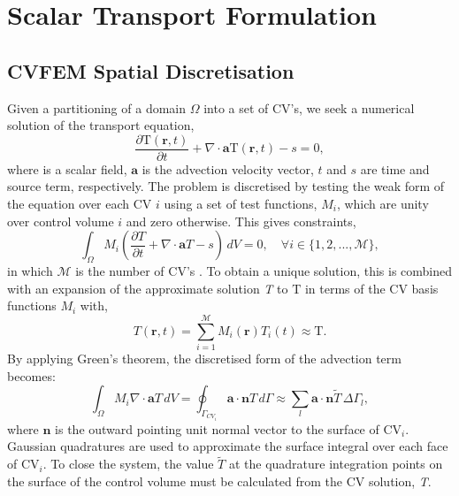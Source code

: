\documentclass[preprint,authoryear,12pt]{elsarticle}
\begin{document}
\section{Scalar Transport Formulation}\label{transport_methods_section}

\subsection{CVFEM Spatial Discretisation}\label{Section:CVFEMDiscretisation}
Given a partitioning of a domain $\Omega$ into a set of CV's, we seek a numerical solution of the transport equation,
\begin{equation}
  \displaystyle\frac{\partial \text{T}(\mathbf{r},t) }{\partial t} +  \nabla\cdot \textbf{a} \text{T}(\mathbf{r},t) - s = 0,
  \label{traneq}
\end{equation}
where  is a scalar field, $\mathbf{a}$ is the advection velocity vector, $\textit{t}$ and $\textit{s}$ are time and source term, respectively. The problem is discretised by testing the weak form of the equation over each CV $i$ using a set of test functions, $M_{i}$, which are unity over control volume $i$ and zero otherwise. This gives constraints,
\begin{equation}
  \int_{\Omega} M_{i} \left( \frac{\partial T }{\partial t} + \nabla\cdot \textbf{a} T - s \right)\,d V = 0, \quad \forall i \in \{1,2,..., \mathcal{M}\},
  \label{CV1}
\end {equation}
in which $\mathcal{M}$ is the number of CV's \citep[which is not necessarily equal to the $\mathcal{N}$ nodes of the underlying FEM mesh,][]{cordazzo_2004, eymard_1994}. To obtain a unique solution, this is combined with an expansion of the approximate solution {\it T} to $\text{T}$ in terms of the CV basis functions $M_{i}$ with,
\begin{equation}  
  T\left(\mathbf{r},t\right)=\sum\limits_{i=1}^{\mathcal{M}} M_{i}\left(\mathbf{r}\right) T_{i}(t) \approx \text{T}.
  \label{transpeqn_approxfield}
\end{equation}
By applying Green's theorem, the discretised form of the advection term becomes:
\begin{equation}
  \int_{\Omega} M_{i} \nabla \cdot \mathbf{a} T \,d V =
  \oint_{\Gamma_{CV_{i}}} \mathbf{a}\cdot \mathbf{n} T \,d \Gamma
  \approx \sum_{l} \mathbf{a}\cdot \mathbf{n}\widetilde{T} \,\Delta
  \Gamma_l,
  \label{transpeqn_green}
\end{equation}
\noindent
where $\mathbf{n}$ is the outward pointing unit normal vector to the surface of CV$_{i}$. Gaussian quadratures are used to approximate the surface integral over each face of CV$_{i}$. To close the system, the value $\widetilde{T}$ at the quadrature integration points on the surface of the control volume must be calculated from the CV solution, \textit{T}.
\end{document}
